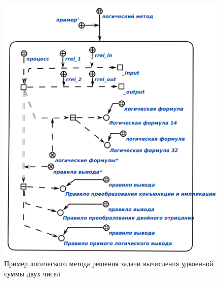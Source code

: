 \begin{figure}[htbp]
  \center
  \includegraphics[scale=0.6]{author/part3/figures/logic_program.png}
  \caption{Пример логического метода решения задачи вычисления удвоенной суммы двух чисел}
  \label{fig:logic_program}
\end{figure}

